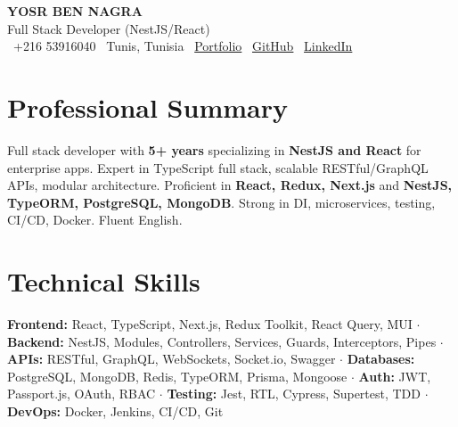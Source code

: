 \documentclass[10pt,a4paper]{article}
\begin{document}
\begin{center}
  {\Large\bfseries\color{primary} YOSR BEN NAGRA}\\[2pt]
  {\small\color{darkgray} Full Stack Developer (NestJS/React)}\\[3pt]
  {\footnotesize
    \faPhone\ +216 53916040 \quad
    \faMapMarker*\ Tunis, Tunisia \quad
    \faGlobe\ \href{https://portfolio-yosr.vercel.app/en}{Portfolio} \quad
    \faGithub\ \href{https://github.com/YosrBennagra}{GitHub} \quad
    \faLinkedin\ \href{https://www.linkedin.com/in/yosr-ben-nagra/}{LinkedIn}
  }
\end{center}

\section*{Professional Summary}
{\small
Full stack developer with \textbf{5+ years} specializing in \textbf{NestJS and React} for enterprise apps. Expert in TypeScript full stack, scalable RESTful/GraphQL APIs, modular architecture. Proficient in \textbf{React, Redux, Next.js} and \textbf{NestJS, TypeORM, PostgreSQL, MongoDB}. Strong in DI, microservices, testing, CI/CD, Docker. Fluent English.
}

\vspace{6pt}

\section*{Technical Skills}
{\small
\textbf{Frontend:} React, TypeScript, Next.js, Redux Toolkit, React Query, MUI $\cdot$ \textbf{Backend:} NestJS, Modules, Controllers, Services, Guards, Interceptors, Pipes $\cdot$ \textbf{APIs:} RESTful, GraphQL, WebSockets, Socket.io, Swagger $\cdot$ \textbf{Databases:} PostgreSQL, MongoDB, Redis, TypeORM, Prisma, Mongoose $\cdot$ \textbf{Auth:} JWT, Passport.js, OAuth, RBAC $\cdot$ \textbf{Testing:} Jest, RTL, Cypress, Supertest, TDD $\cdot$ \textbf{DevOps:} Docker, Jenkins, CI/CD, Git
}

\vspace{6pt}

\end{document}
